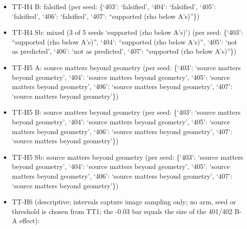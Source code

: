 \documentclass[10pt,twocolumn,letterpaper]{article}
\begin{document}
\begin{itemize}
\item
  TT-H4 B: falsified (per seed: \{`403': `falsified', `404': `falsified', `405': `falsified', `406': `falsified', `407': ``supported (\textbar rho\textbar{} below A's)''\})
\item
  TT-H4 Sb: mixed (3 of 5 seeds `supported (\textbar rho\textbar{} below A's)') (per seed: \{`403': ``supported (\textbar rho\textbar{} below A's)'', `404': ``supported (\textbar rho\textbar{} below A's)'', `405': `not as predicted', `406': `not as predicted', `407': ``supported (\textbar rho\textbar{} below A's)''\})
\item
  TT-H5 A: source matters beyond geometry (per seed: \{`403': `source matters beyond geometry', `404': `source matters beyond geometry', `405': `source matters beyond geometry', `406': `source matters beyond geometry', `407': `source matters beyond geometry'\})
\item
  TT-H5 B: source matters beyond geometry (per seed: \{`403': `source matters beyond geometry', `404': `source matters beyond geometry', `405': `source matters beyond geometry', `406': `source matters beyond geometry', `407': `source matters beyond geometry'\})
\item
  TT-H5 Sb: source matters beyond geometry (per seed: \{`403': `source matters beyond geometry', `404': `source matters beyond geometry', `405': `source matters beyond geometry', `406': `source matters beyond geometry', `407': `source matters beyond geometry'\})
\item
  TT-H6 (descriptive; intervals capture image sampling only; no arm, seed or threshold is chosen from TT1; the -0.03 bar equals the size of the 401/402 B-A effect):


\end{itemize}
\end{document}
